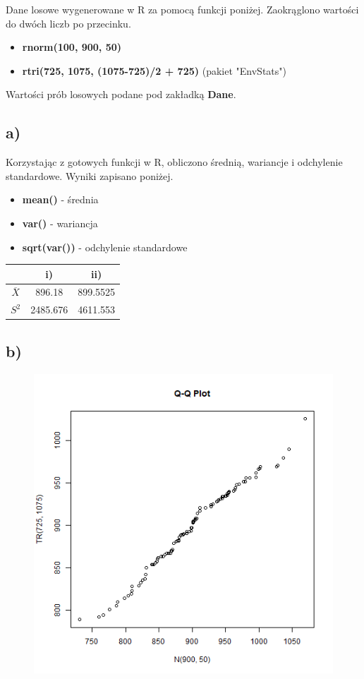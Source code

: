 \documentclass{article}
\begin{document}
Dane losowe wygenerowane w R za pomocą funkcji poniżej. Zaokrąglono wartości do dwóch liczb po przecinku.
\begin{itemize}
\item \textbf{rnorm(100, 900, 50)}
\item \textbf{rtri(725, 1075, (1075-725)/2 + 725)} (pakiet "EnvStats")
\end{itemize}
Wartości prób losowych podane pod zakładką \textbf{Dane}.

\subsection{a)}
Korzystając z gotowych funkcji w R, obliczono średnią, wariancje i odchylenie standardowe. Wyniki zapisano poniżej.
\begin{itemize}
\item \textbf{mean()} - średnia
\item \textbf{var()} - wariancja
\item \textbf{sqrt(var())} - odchylenie standardowe
\end{itemize}

\begin{center} \begin{tabular}{|c|c|c|} \hline
 & i) & ii) \\ \hline
$\overline{X}$ & 896.18 & 899.5525 \\ \hline
$S^2$ & 2485.676 & 4611.553 \\ \hline
\end{tabular} \end{center}

\newpage
\subsection{b)}
\begin{figure}[h!]
\begin{center}
\includegraphics[height = 0.4\textheight, angle = 0]{"w10zad13.png"}
\end{center} \end{figure} 
\end{document}
